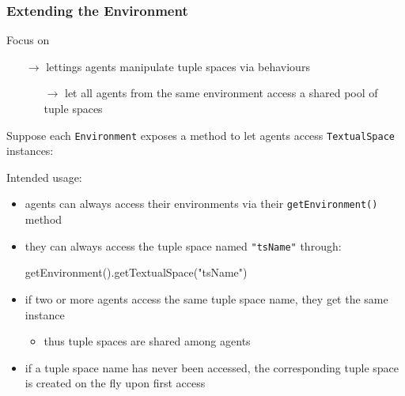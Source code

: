 \documentclass[presentation]{beamer}\mode<presentation>{\usetheme{AMSCesenaPurpleAndGold}}
\begin{document}
\begin{frame}[allowframebreaks]
	\frametitle{Extending the Environment}

	\begin{alertblock}{Focus on}
		\begin{itemize}
			\item[$\rightarrow$] lettings agents manipulate tuple spaces \alert{via behaviours}
			\begin{itemize}
				\item[$\rightarrow$] let all agents from the same environment access a \alert{shared} pool of tuple spaces
			\end{itemize}
		\end{itemize}
	\end{alertblock}

	\bigskip

	Suppose each \texttt{Environment} exposes a method to let agents access \texttt{TextualSpace} instances:
	

	Intended usage:
	\medskip
	\begin{itemize}
		\item agents can always access their environments via their \texttt{getEnvironment()} method

		\medskip

		\item they can always access the tuple space named \alert{\texttt{"tsName"}} through:
		\begin{center}\ttfamily
			getEnvironment().getTextualSpace(\alert{"tsName"})
		\end{center}

		\medskip

		\item if two or more agents access the same tuple space name, they get the \alert{same} instance
		\begin{itemize}
			\item thus tuple spaces are \alert{shared} among agents
		\end{itemize}

		\medskip

		\item if a tuple space name has never been accessed, the corresponding tuple space is created \alert{on the fly} upon first access

	\end{itemize}

\end{frame}
\end{document}

